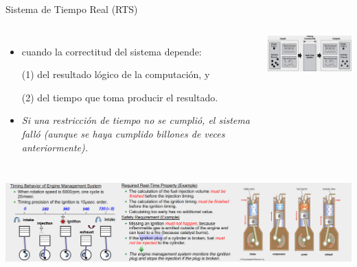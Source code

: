 \documentclass[8pt,aspectratio=169,compress]{beamer}
\begin{document}
\begin{frame}{Sistema de Tiempo Real (RTS)}

   \begin{columns}[onlytextwidth,T]
     \column{\dimexpr\linewidth-70mm-5mm}

\begin{itemize}
  \item[RTS] cuando la correctitud del sistema depende:

\bigskip
(1) del resultado lógico de la computación, y

\bigskip
(2) del tiempo que toma producir el resultado.

\bigskip
  \item[FALLO] \textit{Si una restricción de tiempo no se cumplió, el sistema falló (aunque se haya cumplido billones de veces anteriormente).}

\end{itemize}

      \column{70mm}
    \includegraphics[width=70mm]{images/rts.jpg}

    \end{columns}
\bigskip
    \includegraphics[width=140mm]{images/ejemplo1.jpg}

\end{frame}
\end{document}
